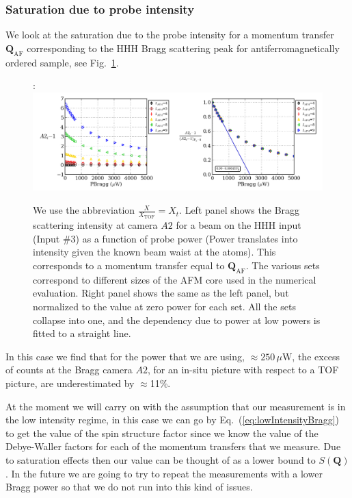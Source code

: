 \documentclass[11pt,letter]{article}
\newcommand{\bv}[1]{\ensuremath{\bm{#1}}}
\begin{document}
\subsubsection{Saturation due to probe intensity} 

We look at the saturation due to the probe intensity for a momentum transfer $\bv{Q}_{\mathrm{AF}}$ corresponding to the HHH Bragg scattering peak for antiferromagnetically ordered sample, see Fig.~\ref{fig:pbragg_HHH}. 
\begin{figure}:
\centering \includegraphics[width=\textwidth]{../pbragg_HHH/pbragg_HHH.png}
\caption[Bragg vs. Power]{\small We use the abbreviation $\frac{X}{X_{\mathrm{TOF}}}=X_{t}$. Left panel shows the Bragg scattering
intensity at camera $A2$ for a beam on the HHH input (Input \#3) as a
function of probe power (Power translates into intensity given the known
beam waist at the atoms). This corresponds to a momentum transfer equal
to $\bv{Q}_{\mathrm{AF}}$.  The various sets correspond to different
sizes of the AFM core used in the numerical evaluation.   Right panel
shows the same as the left panel, but normalized to the value at zero
power for each set.  All the sets collapse into one, and the dependency due to power at low powers is fitted to a straight line.} \label{fig:pbragg_HHH}
\end{figure}
In this case we find that for the power that we are using, $\approx 250
\,\mu\mathrm{W}$,  the excess of counts at the Bragg camera $A2$, for an
in-situ picture with respect to a TOF picture, are underestimated by $\approx$11\%.   

At the moment we will carry on with the assumption that our measurement
is in the low intensity regime, in this case we can go by
Eq.~(\ref{eq:lowIntensityBragg}) to get the value of the spin structure
factor since we know the value of the Debye-Waller factors for each of
the momentum transfers that we measure.  Due to saturation effects then our value can be thought of as a lower bound to $S(\bv{Q})$.  In the future we are going to try to repeat the measurements with a lower Bragg power so that we do not run into this kind of issues.   
\end{document}
